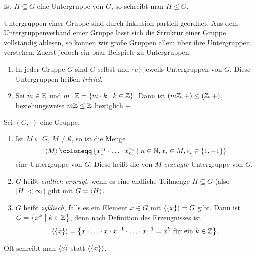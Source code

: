 {\begin{notation}[Untergruppe]
  Ist $H \subseteq G$ eine Untergruppe von $G$, so schreibt man $H \leq G$.
\end{notation}

Untergruppen einer Gruppe sind durch Inklusion partiell geordnet. Aus dem Untergruppenverband einer Gruppe lässt sich die Struktur einer Gruppe vollständig ablesen, so können wir große Gruppen allein über ihre Untergruppen verstehen. Zuerst jedoch ein paar Beispiele zu Untergruppen.

\begin{example}
  \leavevmode \vspace{-\baselineskip}
  \begin{enumerate}[label=\alph*)]
    \item In jeder Gruppe $G$ sind $G$ selbst und $\{e\}$ jeweils Untergruppen von $G$. Diese Untergruppen heißen \emph{trivial}.
    \item Sei $m \in \mathbb{Z}$ und $m \cdot \ZZ = \left\{m \cdot k \suchthat k \in \ZZ \right\}$. Dann ist $(m\mathbb{Z},+) \leq (\mathbb{Z},+)$, beziehungsweise $m\mathbb{Z} \leq \mathbb{Z}$ bezüglich $+$.
  \end{enumerate}
\end{example}

\begin{definition}[Erzeugnis]
  Sei $(G,\cdot)$ eine Gruppe.
  \begin{enumerate}
    \item Ist $M \subseteq G$, $M \neq \emptyset$, so ist die Menge
    \[\ip{M} \coloneqq \left\{x_1^{\epsilon_1} \cdot \ldots \cdot x_n^{\epsilon_n} \suchthat n \in \NN, x_i \in M, \epsilon_i \in \{1,-1\}\right\}\] eine Untergruppe von $G$. Diese heißt die von $M$ \emph{erzeugte} Untergruppe von $G$.
    \item $G$ heißt \emph{endlich erzeugt}, wenn es eine endliche Teilmenge $H \subseteq G$ (also ${\left\lvert H \right\rvert} < \infty$) gibt mit $G = \left\langle H \right\rangle$.
    \item $G$ heißt \emph{zyklisch}, falls es ein Element $x \in G$ mit $\left\langle \{x\} \right\rangle = G$ gibt. Dann ist $G = \left\{x^k \suchthat k \in \ZZ \right\}$, denn nach Definition des Erzeugnisses ist \[\left\langle \{x\} \right\rangle = \left\{x \cdot \ldots \cdot x \cdot x^{-1} \cdot \ldots \cdot x^{-1} = x^k \text{ für ein } k \in \mathbb{Z} \right\}.\]
  \end{enumerate}
\end{definition}

\begin{notation}
  Oft schreibt man $\left\langle x \right\rangle$ statt $\left\langle \{x\} \right\rangle$.
\end{notation}

}
